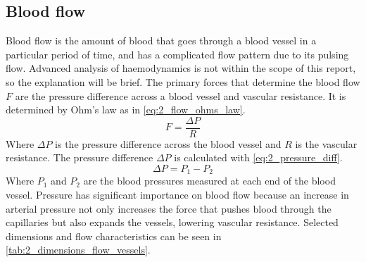 \subsection{Blood flow}
Blood flow is the amount of blood that goes through a blood vessel in a particular period of time, and has a complicated flow pattern due to its pulsing flow. Advanced analysis of haemodynamics is not within the scope of this report, so the explanation will be brief. The primary forces that determine the blood flow $F$ are the pressure difference across a blood vessel and vascular resistance. It is determined by Ohm's law as in \cref{eq:2_flow_ohms_law}.
\begin{equation} \label{eq:2_flow_ohms_law}
	F = \frac{\Delta P}{R}
\end{equation}
Where $\Delta P$ is the pressure difference across the blood vessel and $R$ is the vascular resistance. The pressure difference $\Delta P$ is calculated with \cref{eq:2_pressure_diff}.
\begin{equation} \label{eq:2_pressure_diff}
	\Delta P = P_{1}-P_{2}
\end{equation}
Where $P_{1}$ and $P_{2}$ are the blood pressures measured at each end of the blood vessel. Pressure has significant importance on blood flow because an increase in arterial pressure not only increases the force that pushes blood through the capillaries but also expands the vessels, lowering vascular resistance. Selected dimensions and flow characteristics can be seen in \cref{tab:2_dimensions_flow_vessels}.

